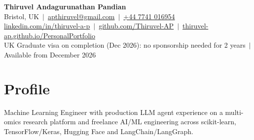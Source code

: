 \documentclass[a4paper,10pt]{article}
\begin{document}
\fontsize{10.5}{12.6}\selectfont

\begin{center}
  {\LARGE\bfseries Thiruvel Andagurunathan Pandian}\\[3pt]
  Bristol, UK \,$|$\, \href{mailto:apthiruvel@gmail.com}{apthiruvel@gmail.com} \,$|$\, \href{tel:+447741016954}{+44 7741 016954}\\[1pt]
\href{https://www.linkedin.com/in/thiruvel-a-p/}{linkedin.com/in/thiruvel-a-p} \,$|$\, \href{https://github.com/Thiruvel-AP}{github.com/Thiruvel-AP} \,$|$\, \href{https://thiruvel-ap.github.io/PersonalPortfolio/}{thiruvel-ap.github.io/PersonalPortfolio}\\[1pt]
  UK Graduate visa on completion (Dec 2026): no sponsorship needed for 2 years \,$|$\, Available from December 2026
\end{center}

\section{Profile}
Machine Learning Engineer with production LLM agent experience on a multi-omics research platform and freelance AI/ML engineering across scikit-learn, TensorFlow/Keras, Hugging Face and LangChain/LangGraph.

\end{document}
